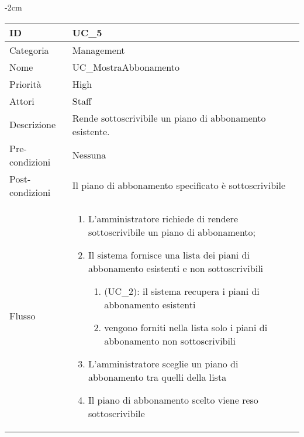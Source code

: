 \begin{center}
\begin{table}[bp]
    \centering
    \addtolength{\leftskip} {-2cm}
\begin{tabular}{ |p{2.6cm}|p{13cm}|  }
\hline
ID & UC\_5 \\\hline
Categoria & Management\\\hline
Nome & UC\_MostraAbbonamento\\\hline
Priorità & High \\\hline
Attori &  Staff \\\hline
Descrizione & Rende sottoscrivibile un piano di abbonamento esistente.\\\hline
Pre-condizioni &  Nessuna \\\hline
Post-condizioni &  Il piano di abbonamento specificato è sottoscrivibile\\\hline
Flusso &  	\begin{enumerate}
		\item L'amministratore richiede di rendere sottoscrivibile un piano di abbonamento;
		\item Il sistema fornisce una lista dei piani di abbonamento esistenti e non sottoscrivibili
			\begin{enumerate}[  ]
			\item (UC\_2): il sistema recupera i piani di abbonamento esistenti
			\item vengono forniti nella lista solo i piani di abbonamento non sottoscrivibili
			\end{enumerate}
		\item L'amministratore sceglie un piano di abbonamento tra quelli della lista
		\item Il piano di abbonamento scelto viene reso sottoscrivibile
		\end{enumerate}\\\hline
\end{tabular}
\label{table_use_case:5}\newline
\end{table}



\end{center}
